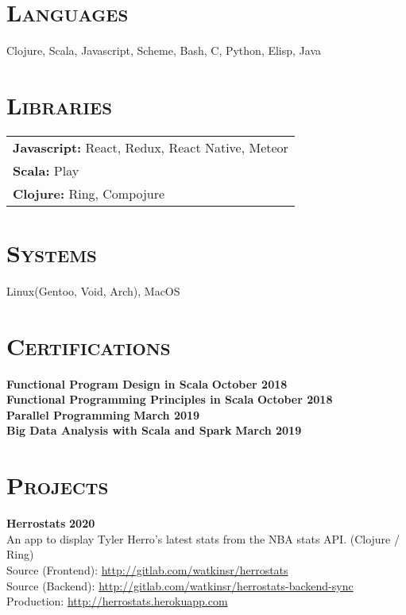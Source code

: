 \documentclass[line, margin, 10pt]{res}
\begin{document}
\begin{resume}
\section{\textsc{Languages}}
Clojure, Scala, Javascript, Scheme, Bash, C, Python, Elisp, Java

\section{\textsc{Libraries}}
\begin{tabular}[t]{@{} p{6.0 in}  @{}}
  {\bf Javascript:} React, Redux, React Native, Meteor \\
  {\bf Scala:} Play \\ 
  {\bf Clojure:} Ring, Compojure \\
\end{tabular}


\section{\textsc {Systems}}
Linux(Gentoo, Void, Arch), MacOS \\

\section{\textsc{Certifications}}
{\bf Functional Program Design in Scala} {\bf \hfill October 2018}\\
{\bf Functional Programming Principles in Scala} {\bf \hfill October 2018}\\
{\bf Parallel Programming} {\bf \hfill March 2019}\\
{\bf Big Data Analysis with Scala and Spark} {\bf \hfill March 2019}\\

\newpage
\section{\textsc{Projects}}

{\bf Herrostats} {\bf \hfill 2020}\\
An app to display Tyler Herro's latest stats from the NBA stats API. (Clojure / Ring) \\
Source (Frontend): \url{http://gitlab.com/watkinsr/herrostats}\\
Source (Backend): \url{http://gitlab.com/watkinsr/herrostats-backend-sync}\\
Production: \url{http://herrostats.herokuapp.com}\\


\end{resume}
\end{document}
